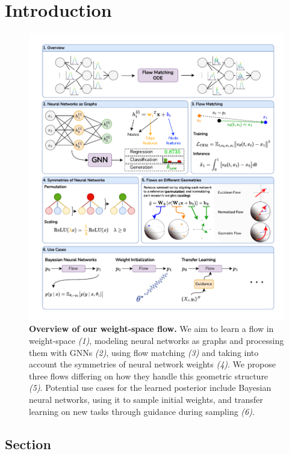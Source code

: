 
\chapter{Introduction}\label{chapter:introduction}

\begin{figure}[t!]
    \centering
    \includegraphics[width=\textwidth]{figures/weightflow.drawio.pdf}
    \caption{\label{fig:main}\textbf{Overview of our weight-space flow.} We aim to learn a flow in weight-space \textit{(1)}, modeling neural networks as graphs and processing them with GNNs \textit{(2)}, using flow matching \textit{(3)} and taking into account the symmetries of neural network weights \textit{(4)}. We propose three flows differing on how they handle this geometric structure \textit{(5)}. Potential use cases for the learned posterior include Bayesian neural networks, using it to sample initial weights, and transfer learning on new tasks through guidance during sampling \textit{(6)}.}
\end{figure}

\section{Section}
